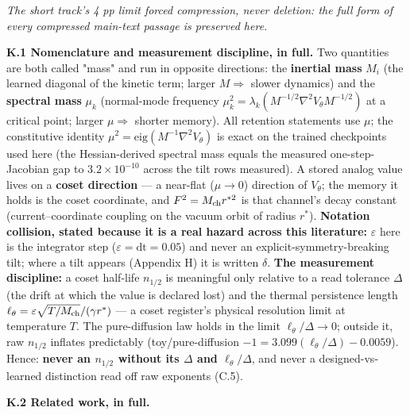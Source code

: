 \documentclass{article}
\begin{document}
\emph{The short track's 4 pp limit forced compression, never deletion: the full form of every compressed main-text passage is preserved here.}

\textbf{K.1 Nomenclature and measurement discipline, in full.} Two quantities are both called "mass" and run in opposite directions: the \textbf{inertial mass} $M_i$ (the learned diagonal of the kinetic term; larger $M\Rightarrow$ slower dynamics) and the \textbf{spectral mass} $\mu_k$ (normal-mode frequency $\mu_k^2=\lambda_k(M^{-1/2}\nabla^2V_\theta M^{-1/2})$ at a critical point; larger $\mu\Rightarrow$ shorter memory). All retention statements use $\mu$; the constitutive identity $\mu^2=\mathrm{eig}(M^{-1}\nabla^2V_\theta)$ is exact on the trained checkpoints used here (the Hessian-derived spectral mass equals the measured one-step-Jacobian gap to $3.2\times10^{-10}$ across the tilt rows measured). A stored analog value lives on a \textbf{coset direction} --- a near-flat ($\mu\to0$) direction of $V_\theta$; the memory it holds is the coset coordinate, and $F^2=M_{\rm ch}r^{*2}$ is that channel's decay constant (current--coordinate coupling on the vacuum orbit of radius $r^*$). \textbf{Notation collision, stated because it is a real hazard across this literature:} $\varepsilon$ here is the integrator step ($\varepsilon=\mathrm{dt}=0.05$) and never an explicit-symmetry-breaking tilt; where a tilt appears (Appendix H) it is written $\delta$. \textbf{The measurement discipline:} a coset half-life $n_{1/2}$ is meaningful only relative to a read tolerance $\Delta$ (the drift at which the value is declared lost) and the thermal persistence length $\ell_\theta=\varepsilon\sqrt{T/M_{\rm ch}}/(\gamma r^*)$ --- a coset register's physical resolution limit at temperature $T$. The pure-diffusion law holds in the limit $\ell_\theta/\Delta\to0$; outside it, raw $n_{1/2}$ inflates predictably (toy/pure-diffusion $-1=3.099(\ell_\theta/\Delta)-0.0059$). Hence: \textbf{never an $n_{1/2}$ without its $\Delta$ and $\ell_\theta/\Delta$}, and never a designed-vs-learned distinction read off raw exponents (C.5).

\textbf{K.2 Related work, in full.}
\end{document}
